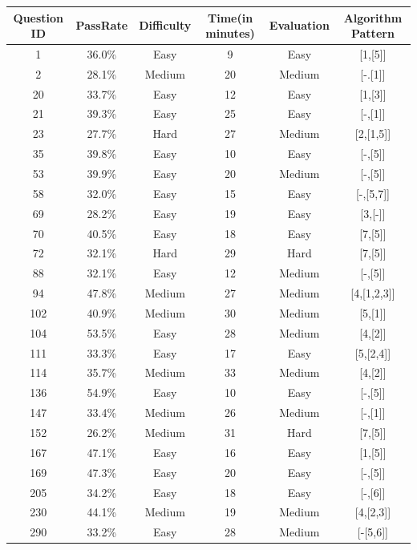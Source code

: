 \documentclass[conference]{IEEEtran}
\begin{document}
\begin{table}
\begin{tabular}{|c| c| c| c| c| c|} \hline
 {\bf Question ID} & {\bf PassRate} & {\bf Difficulty} & {\bf Time(in minutes)} & {\bf Evaluation} & {\bf Algorithm Pattern} \\
	 \hline
 	1 & 36.0\% & Easy & 9 & Easy & [1,[5]]\\ 
 	\hline
	 2 & 28.1\% & Medium & 20 &Medium& [-.[1]]\\
 	\hline
	 20 & 33.7\% & Easy & 12&Easy& [1,[3]] \\
 	\hline
 	21 & 39.3\% & Easy & 25&Easy& [-,[1]] \\
 	\hline
 	23 & 27.7\% & Hard & 27&Medium&[2,[1,5]] \\
  	\hline
 	35 &39.8\%  & Easy & 10 &Easy&[-,[5]]\\
  	\hline
 	53 &39.9\%  & Easy & 20 &Medium& [-,[5]]\\
  	\hline
 	58 & 32.0\% & Easy & 15 &Easy&[-,[5,7]]\\
  	\hline
 	69 & 28.2\% & Easy & 19 &Easy&[3,[-]]\\
  	\hline
 	70 & 40.5\% & Easy & 18 &Easy&[7,[5]]\\
 	\hline
 	72 & 32.1\% & Hard & 29 &Hard&[7,[5]]\\
  	\hline
 	88 & 32.1\% & Easy & 12 &Medium&[-,[5]]\\
  	\hline
 	94 & 47.8\% & Medium & 27 & Medium&[4,[1,2,3]]\\
  	\hline
 	102 & 40.9\% & Medium & 30  &Medium & [5,[1]]\\
  	\hline
	104 & 53.5\% &Easy  &28  &Medium& [4,[2]]\\
  	\hline
 	111 &  33.3\%& Easy&17  &Easy& [5,[2,4]]\\
  	\hline
 	114 & 35.7\% &Medium  & 33  &Medium&[4,[2]]\\
  	\hline
 	136 &54.9\%  &Easy  &10  &Easy& [-,[5]]\\
  	\hline
 	147 & 33.4\% &Medium  &26  &Medium& [-,[1]]\\
	\hline
 	152 &  26.2\%& Medium & 31 &Hard&[7,[5]]\\
  	\hline
  	167 & 47.1\% &Easy  &16  &Easy&[1,[5]]\\
  	\hline
  	169 & 47.3\% &Easy  &20  &Easy&[-,[5]]\\
  	\hline
  	205 & 34.2\% &Easy  &18  &Easy& [-,[6]]\\
  	\hline
  	230 & 44.1\% &Medium  &19  &Medium&[4,[2,3]]\\
  	\hline
 	290 & 33.2\% &Easy  &28  &Medium&[-[5,6]]\\

\end{tabular}
\end{table}
\end{document}
